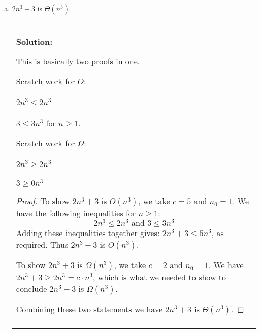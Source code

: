 \documentclass[12pt]{article}
\newenvironment{solution}
	{\begin{center}
	\begin{tabular}{|p{0.9\textwidth}|}
	\hline\\
	\textbf{Solution:}
	}
	{\\\\
	\hline
	\end{tabular}
	\end{center}
	}
\begin{document}
\begin{enumerate}[(a)]
\begin{solution}
			\begin{proof}
				We take $c = \frac{1}{\log_3(5)}$, and $n_0 = 1$. Applying the change-of-base formula:
				\[ \log_5(n) = \frac{\log_3(n)}{\log_3(5)} \geq c\cdot \log_3(n)\] for all $n\geq 1$.
			\end{proof}
		\end{solution}
	\item $2n^3 + 3$ is $\Theta(n^3)$
		\begin{solution}
			This is basically two proofs in one.
			
			Scratch work for $O$:\\
			$2n^3 \leq 2n^3$\\
			$3 \leq 3n^3$ for $n \geq 1$. 
			
			Scratch work for $\Omega$:\\
			$2n^3 \geq 2n^3$\\
			$3 \geq 0n^3$ 
			
			\begin{proof}
				To show $2n^3 + 3$ is $O(n^3)$, we take $c = 5$ and $n_0 = 1$.
				We have the following inequalities for $n\geq 1$:
				\[ 2n^3 \leq 2n^3 \text{ and } 3 \leq 3n^3 \]
				Adding these inequalities together gives: $2n^3 + 3 \leq 5n^3$, as required. Thus $2n^3 + 3$ is $O(n^3)$.
				
				To show $2n^3 + 3$ is $\Omega(n^3)$, we take $c = 2$ and $n_0 = 1$. 
				We have $2n^3 + 3 \geq 2n^3 = c\cdot n^3$, which is what we needed to show to conclude $2n^3 + 3$ is $\Omega(n^3)$.
				
				Combining these two statements we have $2n^3 + 3$ is $\Theta(n^3)$. 
			\end{proof}
		\end{solution}	
	
\end{enumerate}
\end{document}
